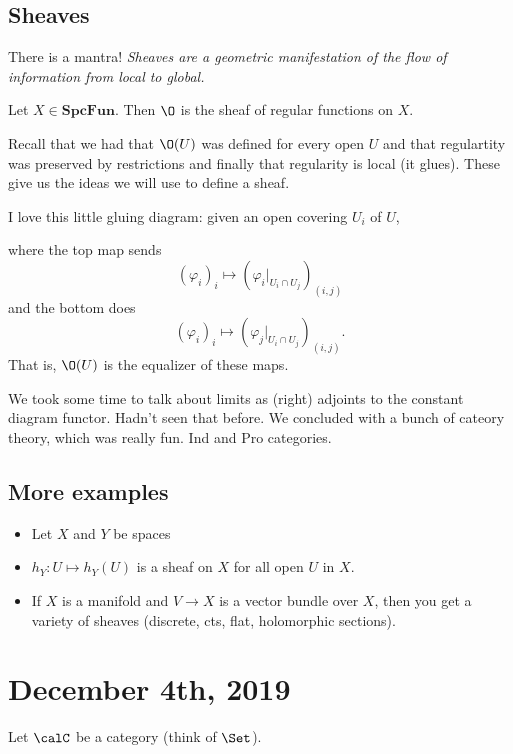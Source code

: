 \documentclass[12pt]{article}
\newcommand{\SpcFun}{\mathbf{SpcFun}}
\begin{document}
\subsection{Sheaves}
There is a mantra! \textit{Sheaves are a geometric manifestation of the flow of information from local to global.}
\begin{ex}
	Let $X\in\SpcFun$. Then $\O$ is the sheaf of regular functions on $X$.
\end{ex}
\begin{rmk}
	Recall that we had that $\O(U)$ was defined for every open $U$ and that regulartity was preserved by 
	restrictions and finally that regularity is local (it glues). These give us the ideas we will use to define a sheaf.
\end{rmk}
I love this little gluing diagram: given an open covering $U_i$ of $U$,
\begin{center}
\end{center}
where the top map sends
\[(\varphi_i)_i\mapsto (\varphi_i|_{U_i\cap U_j})_{(i,j)}\]
and the bottom does 
\[(\varphi_i)_i\mapsto (\varphi_j|_{U_i\cap U_j})_{(i,j)}.\]
That is, $\O(U)$ is the equalizer of these maps.

We took some time to talk about limits as (right) adjoints to the constant diagram functor. Hadn't seen that before.
We concluded with a bunch of cateory theory, which was really fun. Ind and Pro categories.
\subsection{More examples}
\begin{itemize}
	\item Let $X$ and $Y$ be spaces
	\item $h_Y:U\mapsto h_Y(U)$ is a sheaf on $X$ for all open $U$ in $X$.
	\item If $X$ is a manifold and $V\to X$ is a vector bundle over $X$, then you get a variety of sheaves (discrete, cts, flat, holomorphic sections).
\end{itemize}

\section{December 4th, 2019}
Let $\calC$ be a category (think of $\Set$).
\end{document}
